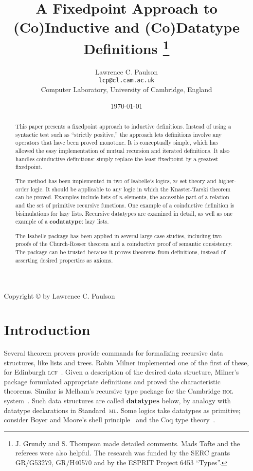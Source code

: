 \documentclass[12pt]{article}
\title{A Fixedpoint Approach to\\ 
  (Co)Inductive and (Co)Datatype Definitions%
  \thanks{J. Grundy and S. Thompson made detailed comments.  Mads Tofte and
    the referees were also helpful.  The research was funded by the SERC
    grants GR/G53279, GR/H40570 and by the ESPRIT Project 6453 ``Types''.}}
\author{Lawrence C. Paulson\\{\tt lcp@cl.cam.ac.uk}\\
        Computer Laboratory, University of Cambridge, England}
\date{\today}
\newcommand\defn[1]{{\bf#1}}
\begin{document}
\pagestyle{empty}
\begin{titlepage}
\maketitle 
\begin{abstract}
  This paper presents a fixedpoint approach to inductive definitions.
  Instead of using a syntactic test such as ``strictly positive,'' the
  approach lets definitions involve any operators that have been proved
  monotone.  It is conceptually simple, which has allowed the easy
  implementation of mutual recursion and iterated definitions.  It also
  handles coinductive definitions: simply replace the least fixedpoint by a
  greatest fixedpoint.  

  The method has been implemented in two of Isabelle's logics, \textsc{zf} set
  theory and higher-order logic.  It should be applicable to any logic in
  which the Knaster-Tarski theorem can be proved.  Examples include lists of
  $n$ elements, the accessible part of a relation and the set of primitive
  recursive functions.  One example of a coinductive definition is
  bisimulations for lazy lists.  Recursive datatypes are examined in detail,
  as well as one example of a \defn{codatatype}: lazy lists.

  The Isabelle package has been applied in several large case studies,
  including two proofs of the Church-Rosser theorem and a coinductive proof of
  semantic consistency.  The package can be trusted because it proves theorems
  from definitions, instead of asserting desired properties as axioms.
\end{abstract}
%
\bigskip
\centerline{Copyright \copyright{} \number\year{} by Lawrence C. Paulson}
\thispagestyle{empty} 
\end{titlepage}
\tableofcontents\cleardoublepage\pagestyle{plain}

\setcounter{page}{1}

\section{Introduction}
Several theorem provers provide commands for formalizing recursive data
structures, like lists and trees.  Robin Milner implemented one of the first
of these, for Edinburgh \textsc{lcf}~\cite{milner-ind}.  Given a description
of the desired data structure, Milner's package formulated appropriate
definitions and proved the characteristic theorems.  Similar is Melham's
recursive type package for the Cambridge \textsc{hol} system~\cite{melham89}.
Such data structures are called \defn{datatypes}
below, by analogy with datatype declarations in Standard~\textsc{ml}\@.
Some logics take datatypes as primitive; consider Boyer and Moore's shell
principle~\cite{bm79} and the Coq type theory~\cite{paulin-tlca}.
\end{document}
